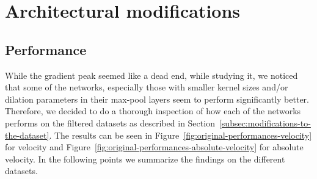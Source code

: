 \section{Architectural modifications}\label{sec:architectural-modifications}
\subsection{Performance}\label{subsec:performance}
While the gradient peak seemed like a dead end, while studying it, we noticed that some of the networks, especially those with smaller kernel sizes and/or dilation parameters in their max-pool layers seem to perform significantly better.
Therefore, we decided to do a thorough inspection of how each of the networks performs on the filtered datasets as described in Section~\ref{subsec:modifications-to-the-dataset}.
The results can be seen in Figure~\ref{fig:original-performances-velocity} for velocity and Figure~\ref{fig:original-performances-absolute-velocity} for absolute velocity.
In the following points we summarize the findings on the different datasets.


